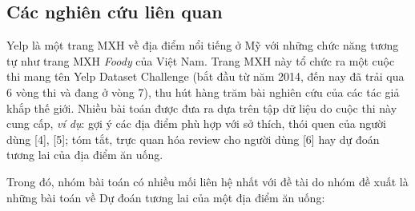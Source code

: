 \documentclass[12pt]{extarticle}
\begin{document}
		\subsection{Các nghiên cứu liên quan}
			\par Yelp là một trang MXH về địa điểm nổi tiếng ở Mỹ với những chức năng tương tự như trang MXH \textit{Foody}  của Việt Nam. Trang MXH này tổ chức ra một cuộc thi mang tên Yelp Dataset Challenge (bắt đầu từ năm 2014, đến nay đã trải qua 6 vòng thi và đang ở vòng 7), thu hút hàng trăm bài nghiên cứu của các tác giả khắp thế giới. Nhiều bài toán được đưa ra dựa trên tập dữ liệu do cuộc thi này cung cấp, \textit{ví dụ}: gợi ý các địa điểm phù hợp với sở thích, thói quen của người dùng [4], [5]; tóm tắt, trực quan hóa review cho người dùng [6] hay dự đoán tương lai của địa điểm ăn uống.
			\par Trong đó, nhóm bài toán có nhiều mối liên hệ nhất với đề tài do nhóm đề xuất là những bài toán về Dự đoán tương lai của một địa điểm ăn uống:
\end{document}
